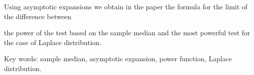 Using asymptotic expansions we obtain in the paper the formula for the limit of the difference between


the power of the test based on the sample median and the most powerful test for the case of Laplace distribution.





Key words: sample median, asymptotic expansion, power function, Laplace distribution.


